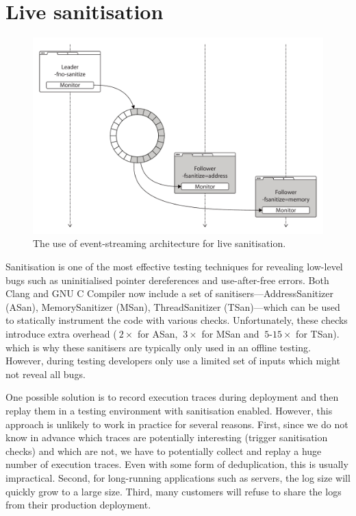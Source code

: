 \section{Live sanitisation}
\label{sec:sanitization}

\begin{figure}[t]
  \begin{center}
    \includegraphics[width=0.75\columnwidth]{applications/figures/live-sanitization}
    \caption{The use of event-streaming architecture for live sanitisation.}
    \label{fig:live-sanitization}
  \end{center}
\end{figure}

Sanitisation is one of the most effective testing techniques for revealing
low-level bugs such as uninitialised pointer dereferences and use-after-free
errors.  Both Clang and GNU C Compiler now include a set of
sanitisers---AddressSanitizer (ASan), MemorySanitizer (MSan), ThreadSanitizer
(TSan)---which can be used to statically instrument the code with various
checks.  Unfortunately, these checks introduce extra overhead (\eg $~2\times$
for ASan, $~3\times$ for MSan and $~5$-$15\times$ for TSan).  which is why
these sanitisers are typically only used in an offline testing. However, during
testing developers only use a limited set of inputs which might not reveal all
bugs.

One possible solution is to record execution traces during deployment and then
replay them in a testing environment with sanitisation enabled. However, this
approach is unlikely to work in practice for several reasons. First, since we
do not know in advance which traces are potentially interesting (\eg trigger
sanitisation checks) and which are not, we have to potentially collect and
replay a huge number of execution traces. Even with some form of deduplication,
this is usually impractical. Second, for long-running applications such as
servers, the log size will quickly grow to a large size. Third, many customers
will refuse to share the logs from their production deployment.


